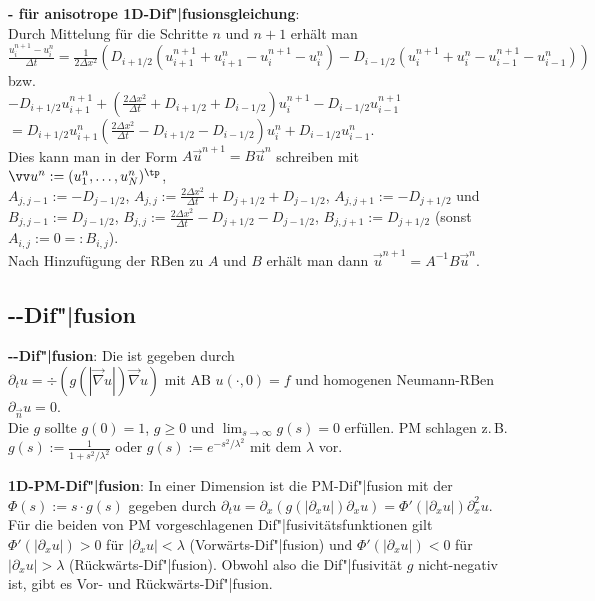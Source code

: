 \textbf{- für anisotrope 1D-Dif"|fusionsgleichung}:\\
Durch Mittelung für die Schritte $n$ und $n + 1$ erhält man\\
$\frac{u_i^{n+1} - u_i^n}{\Delta t} =
\frac{1}{2\Delta x^2}  (D_{i+1/2} (u_{i+1}^{n+1} + u_{i+1}^n - u_i^{n+1} - u_i^n) -
D_{i-1/2} (u_i^{n+1} + u_i^n - u_{i-1}^{n+1} - u_{i-1}^n))$ bzw.\\
$-D_{i+1/2} u_{i+1}^{n+1} + (\frac{2\Delta x^2}{\Delta t} + D_{i+1/2} + D_{i-1/2}) u_i^{n+1} -
D_{i-1/2} u_{i-1}^{n+1}$\\
$= D_{i+1/2} u_{i+1}^n (\frac{2\Delta x^2}{\Delta t} - D_{i+1/2} - D_{i-1/2}) u_i^n +
D_{i-1/2} u_{i-1}^n$.\\
Dies kann man in der Form $A\vec{u}^{n+1} = B\vec{u}^n$ schreiben mit
$\vec{u}^n := (u_1^n, \dotsc, u_N^n)^\tp$,\\
$A_{j,j-1} := -D_{j-1/2}$,
$A_{j,j} := \frac{2\Delta x^2}{\Delta t} + D_{j+1/2} + D_{j-1/2}$,
$A_{j,j+1} := -D_{j+1/2}$ und\\
$B_{j,j-1} := D_{j-1/2}$,
$B_{j,j} := \frac{2\Delta x^2}{\Delta t} - D_{j+1/2} - D_{j-1/2}$,
$B_{j,j+1} := D_{j+1/2}$
(sonst $A_{i,j} := 0 =: B_{i,j}$).\\
Nach Hinzufügung der RBen zu $A$ und $B$ erhält man dann $\vec{u}^{n+1} = A^{-1} B\vec{u}^n$.

\pagebreak

\subsection{%
    --Dif"|fusion%
}

\textbf{--Dif"|fusion}:
Die  ist gegeben durch\\
$\partial_t u = \div(g(|\vec{\nabla} u|) \vec{\nabla} u)$
mit AB $u(\cdot, 0) = f$ und homogenen Neumann-RBen $\partial_{\vec{n}} u = 0$.\\
Die  $g$ sollte
$g(0) = 1$, $g \ge 0$ und $\lim_{s \to \infty} g(s) = 0$ erfüllen.
PM schlagen z.\,B. $g(s) := \frac{1}{1 + s^2/\lambda^2}$ oder $g(s) := e^{-s^2/\lambda^2}$ mit
dem  $\lambda$ vor.

\linie

\textbf{1D-PM-Dif"|fusion}:
In einer Dimension ist die PM-Dif"|fusion mit der \\
$\Phi(s) := s \cdot g(s)$ gegeben durch
$\partial_t u = \partial_x (g(|\partial_x u|) \partial_x u) =
\Phi'(|\partial_x u|) \partial_x^2 u$.
Für die beiden von PM vorgeschlagenen Dif"|fusivitätsfunktionen gilt
$\Phi'(|\partial_x u|) > 0$ für $|\partial_x u| < \lambda$ (Vorwärts-Dif"|fusion) und
$\Phi'(|\partial_x u|) < 0$ für $|\partial_x u| > \lambda$ (Rückwärts-Dif"|fusion).
Obwohl also die Dif"|fusivität $g$ nicht-negativ ist, gibt es Vor- und Rückwärts-Dif"|fusion.


